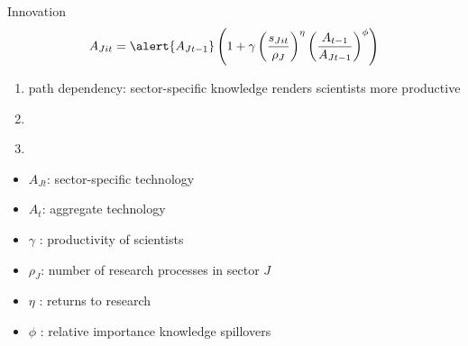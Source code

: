 \documentclass[11pt,aspectratio=169]{beamer}
\begin{document}
\begin{frame}{Innovation}
\pause
\vspace{-10mm}
\vspace{4mm}
\large
\begin{align*}
	A_{Jit}=\alert{A_{Jt-1}}\left(1+\gamma\left(\frac{s_{Jit}}{\rho_J}\right)^\eta\left(\frac{A_{t-1}}{A_{Jt-1}}\right)^\phi\right)
\end{align*}
\normalsize
\begin{enumerate}
	\item \alert{path dependency: sector-specific knowledge renders scientists more productive} %
	\item[] \  %
	\item[] \ %
\end{enumerate}
\small
\vspace{4mm}
\hspace{-2mm}
\begin{minipage}[t!]{0.43\textwidth}
	\vspace{0mm}
	\begin{itemize}
		\item[] $A_{Jt}$: sector-specific technology
		\vspace{-2mm}		
		\item[] $A_t$: aggregate technology
		\vspace{-2mm}
		\item[] $\gamma$ : productivity of scientists
	\end{itemize}
\end{minipage}
\vspace{-5mm}
\begin{minipage}[t!]{0.55\textwidth}
	\vspace{0mm}
	\begin{itemize}	
		\item[] $\rho_J$: number of research processes in sector $J$
		\vspace{-2mm}			
		\item[] $\eta$ : returns to research
		\vspace{-2mm}			
		\item[] $\phi$ : relative importance knowledge spillovers
	\end{itemize}
\end{minipage}
\end{frame}
\end{document}
